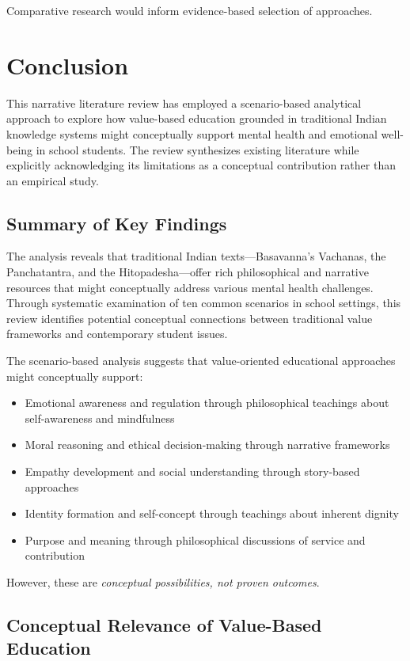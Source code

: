 \documentclass[12pt,a4paper,twocolumn]{article}
\begin{document}
Comparative research would inform evidence-based selection of approaches.

\section{Conclusion}

This narrative literature review has employed a scenario-based analytical approach to explore how value-based education grounded in traditional Indian knowledge systems might conceptually support mental health and emotional well-being in school students. The review synthesizes existing literature while explicitly acknowledging its limitations as a conceptual contribution rather than an empirical study.

\subsection{Summary of Key Findings}

The analysis reveals that traditional Indian texts—Basavanna's Vachanas, the Panchatantra, and the Hitopadesha—offer rich philosophical and narrative resources that might conceptually address various mental health challenges. Through systematic examination of ten common scenarios in school settings, this review identifies potential conceptual connections between traditional value frameworks and contemporary student issues.

The scenario-based analysis suggests that value-oriented educational approaches might conceptually support:
\begin{itemize}
    \item Emotional awareness and regulation through philosophical teachings about self-awareness and mindfulness
    \item Moral reasoning and ethical decision-making through narrative frameworks
    \item Empathy development and social understanding through story-based approaches
    \item Identity formation and self-concept through teachings about inherent dignity
    \item Purpose and meaning through philosophical discussions of service and contribution
\end{itemize}

However, these are \textit{conceptual possibilities, not proven outcomes}.

\subsection{Conceptual Relevance of Value-Based Education}
\end{document}
